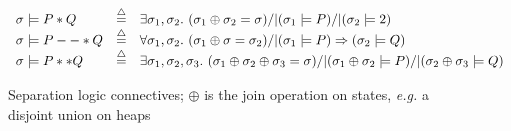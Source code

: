 \begin{figure}
{\footnotesize
\[
\begin{array}{lcl}
\sigma |= P * Q & \mathbin{\stackrel{\triangle}{=}} & \exists \sigma_1, \sigma_2.~ (\sigma_1 \oplus \sigma_2 = \sigma) /| (\sigma_1 |= P) /| (\sigma_2 |= 2)\\
\sigma |= P --* Q & \mathbin{\stackrel{\triangle}{=}} & \forall \sigma_1, \sigma_2.~ (\sigma_1 \oplus \sigma = \sigma_2) /| (\sigma_1 |= P) => (\sigma_2 |= Q) \\
\sigma |= P ** Q & \mathbin{\stackrel{\triangle}{=}} & \exists \sigma_1, \sigma_2, \sigma_3.~ (\sigma_1 \oplus \sigma_2 \oplus \sigma_3 = \sigma) /| (\sigma_1 \oplus \sigma_2 |= P) /| (\sigma_2 \oplus \sigma_3 |= Q)
\end{array}
\]
}
\vspace{-1em}
\caption{Separation logic connectives; $\oplus$ is the join operation on states, \emph{e.g.} a disjoint union on heaps}
\label{fig:seplogsem}
\vspace*{-1em}
\end{figure} 